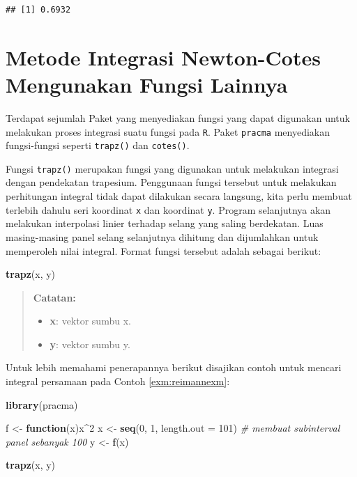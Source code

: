 \documentclass[]{book}
\newenvironment{Shaded}{\begin{snugshade}}{\end{snugshade}}
\newcommand{\CommentTok}[1]{\textcolor[rgb]{0.56,0.35,0.01}{\textit{#1}}}
\newcommand{\ControlFlowTok}[1]{\textcolor[rgb]{0.13,0.29,0.53}{\textbf{#1}}}
\newcommand{\DataTypeTok}[1]{\textcolor[rgb]{0.13,0.29,0.53}{#1}}
\newcommand{\DecValTok}[1]{\textcolor[rgb]{0.00,0.00,0.81}{#1}}
\newcommand{\KeywordTok}[1]{\textcolor[rgb]{0.13,0.29,0.53}{\textbf{#1}}}
\newcommand{\NormalTok}[1]{#1}
\newcommand{\OperatorTok}[1]{\textcolor[rgb]{0.81,0.36,0.00}{\textbf{#1}}}
\newcommand{\StringTok}[1]{\textcolor[rgb]{0.31,0.60,0.02}{#1}}
\providecommand{\tightlist}{%
  \setlength{\itemsep}{0pt}\setlength{\parskip}{0pt}}
\theoremstyle{definition}
\theoremstyle{definition}
\theoremstyle{definition}
\theoremstyle{remark}
\begin{document}
\begin{verbatim}
## [1] 0.6932
\end{verbatim}

\hypertarget{metode-integrasi-newton-cotes-mengunakan-fungsi-lainnya}{%
\section{Metode Integrasi Newton-Cotes Mengunakan Fungsi Lainnya}\label{metode-integrasi-newton-cotes-mengunakan-fungsi-lainnya}}

Terdapat sejumlah Paket yang menyediakan fungsi yang dapat digunakan untuk melakukan proses integrasi suatu fungsi pada \texttt{R}. Paket \texttt{pracma} menyediakan fungsi-fungsi seperti \texttt{trapz()} dan \texttt{cotes()}.

Fungsi \texttt{trapz()} merupakan fungsi yang digunakan untuk melakukan integrasi dengan pendekatan trapesium. Penggunaan fungsi tersebut untuk melakukan perhitungan integral tidak dapat dilakukan secara langsung, kita perlu membuat terlebih dahulu seri koordinat \texttt{x} dan koordinat \texttt{y}. Program selanjutnya akan melakukan interpolasi linier terhadap selang yang saling berdekatan. Luas masing-masing panel selang selanjutnya dihitung dan dijumlahkan untuk memperoleh nilai integral. Format fungsi tersebut adalah sebagai berikut:

\begin{Shaded}
\begin{Highlighting}[]
\KeywordTok{trapz}\NormalTok{(x, y)}
\end{Highlighting}
\end{Shaded}

\begin{quote}
\textbf{Catatan:}

\begin{itemize}
\tightlist
\item
  \textbf{x}: vektor sumbu x.
\item
  \textbf{y}: vektor sumbu y.
\end{itemize}
\end{quote}

Untuk lebih memahami penerapannya berikut disajikan contoh untuk mencari integral persamaan pada Contoh \ref{exm:reimannexm}:

\begin{Shaded}
\begin{Highlighting}[]
\KeywordTok{library}\NormalTok{(pracma)}

\NormalTok{f <-}\StringTok{ }\ControlFlowTok{function}\NormalTok{(x)x}\OperatorTok{^}\DecValTok{2}
\NormalTok{x <-}\StringTok{ }\KeywordTok{seq}\NormalTok{(}\DecValTok{0}\NormalTok{, }\DecValTok{1}\NormalTok{, }\DataTypeTok{length.out =} \DecValTok{101}\NormalTok{) }\CommentTok{# membuat subinterval panel sebanyak 100}
\NormalTok{y <-}\StringTok{ }\KeywordTok{f}\NormalTok{(x)}

\KeywordTok{trapz}\NormalTok{(x, y)}
\end{Highlighting}
\end{Shaded}
\end{document}
